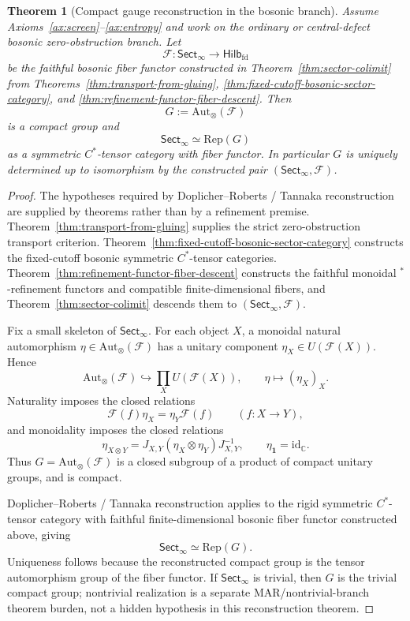 \documentclass[11pt]{article}
\newtheorem{theorem}{Theorem}[section]
\begin{document}
\begin{theorem}[Compact gauge reconstruction in the bosonic branch]\label{thm:compactgauge}
Assume Axioms~\ref{ax:screen}--\ref{ax:entropy} and work on the ordinary or central-defect
bosonic zero-obstruction branch. Let
\[
\mathcal F:\mathsf{Sect}_\infty\to\mathsf{Hilb}_{\mathrm{fd}}
\]
be the faithful bosonic fiber functor constructed in Theorem~\ref{thm:sector-colimit} from
Theorems~\ref{thm:transport-from-gluing},
\ref{thm:fixed-cutoff-bosonic-sector-category}, and
\ref{thm:refinement-functor-fiber-descent}. Then
\[
G:=\mathrm{Aut}_\otimes(\mathcal F)
\]
is a compact group and
\[
\mathsf{Sect}_\infty\simeq \mathrm{Rep}(G)
\]
as a symmetric \(C^*\)-tensor category with fiber functor. In particular \(G\) is uniquely
determined up to isomorphism by the constructed pair \((\mathsf{Sect}_\infty,\mathcal F)\).
\end{theorem}

\begin{proof}
The hypotheses required by Doplicher--Roberts / Tannaka reconstruction are supplied by
theorems rather than by a refinement premise. Theorem~\ref{thm:transport-from-gluing} supplies
the strict zero-obstruction transport criterion. Theorem~\ref{thm:fixed-cutoff-bosonic-sector-category}
constructs the fixed-cutoff bosonic symmetric \(C^*\)-tensor categories.
Theorem~\ref{thm:refinement-functor-fiber-descent} constructs the faithful monoidal
\(^*\)-refinement functors and compatible finite-dimensional fibers, and
Theorem~\ref{thm:sector-colimit} descends them to \((\mathsf{Sect}_\infty,\mathcal F)\).

Fix a small skeleton of \(\mathsf{Sect}_\infty\). For each object \(X\), a monoidal natural
automorphism \(\eta\in\mathrm{Aut}_\otimes(\mathcal F)\) has a unitary component
\(\eta_X\in U(\mathcal F(X))\). Hence
\[
\mathrm{Aut}_\otimes(\mathcal F)
\hookrightarrow
\prod_X U(\mathcal F(X)),
\qquad
\eta\mapsto(\eta_X)_X.
\]
Naturality imposes the closed relations
\[
\mathcal F(f)\eta_X=\eta_Y\mathcal F(f)
\qquad(f:X\to Y),
\]
and monoidality imposes the closed relations
\[
\eta_{X\otimes Y}
=
J_{X,Y}(\eta_X\otimes\eta_Y)J_{X,Y}^{-1},
\qquad
\eta_{\mathbf 1}=\mathrm{id}_{\mathbb C}.
\]
Thus \(G=\mathrm{Aut}_\otimes(\mathcal F)\) is a closed subgroup of a product of compact unitary
groups, and is compact.

Doplicher--Roberts / Tannaka reconstruction applies to the rigid symmetric \(C^*\)-tensor
category with faithful finite-dimensional bosonic fiber functor constructed above, giving
\[
\mathsf{Sect}_\infty\simeq\mathrm{Rep}(G).
\]
Uniqueness follows because the reconstructed compact group is the tensor automorphism group of
the fiber functor. If \(\mathsf{Sect}_\infty\) is trivial, then \(G\) is the trivial compact group;
nontrivial realization is a separate MAR/nontrivial-branch theorem burden, not a hidden hypothesis
in this reconstruction theorem.
\end{proof}
\end{document}
